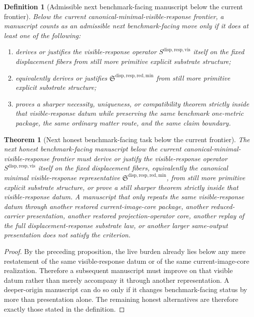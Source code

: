 \documentclass[11pt]{article}
\newcommand{\VisibleResponseOperator}{S^{\mathrm{disp,resp,vis}}}
\newcommand{\MinimalReducedStructure}{\mathfrak S^{\mathrm{disp,resp,red,min}}}
\newtheorem{definition}{Definition}
\newtheorem{theorem}{Theorem}
\begin{document}
\begin{definition}[Admissible next benchmark-facing manuscript below the current frontier]
Below the current canonical-minimal-visible-response frontier, a manuscript counts as an admissible next benchmark-facing move only if it does at least one of the following:
\begin{enumerate}
    \item derives or justifies the visible-response operator \(\VisibleResponseOperator\) itself on the fixed displacement fibers from still more primitive explicit substrate structure;
    \item equivalently derives or justifies \(\MinimalReducedStructure\) from still more primitive explicit substrate structure;
    \item proves a sharper necessity, uniqueness, or compatibility theorem strictly inside that visible-response datum while preserving the same benchmark one-metric package, the same ordinary matter route, and the same claim boundary.
\end{enumerate}
\end{definition}

\begin{theorem}[Next honest benchmark-facing task below the current frontier]
The next honest benchmark-facing manuscript below the current canonical-minimal-visible-response frontier must derive or justify the visible-response operator \(\VisibleResponseOperator\) itself on the fixed displacement fibers, equivalently the canonical minimal visible-response representative \(\MinimalReducedStructure\), from still more primitive explicit substrate structure, or prove a still sharper theorem strictly inside that visible-response datum. A manuscript that only repeats the same visible-response datum through another restored current-image-core package, another reduced-carrier presentation, another restored projection-operator core, another replay of the full displacement-response substrate law, or another larger same-output presentation does not satisfy the criterion.
\end{theorem}

\begin{proof}
By the preceding proposition, the live burden already lies below any mere restatement of the same visible-response datum or of the same current-image-core realization. Therefore a subsequent manuscript must improve on that visible datum rather than merely accompany it through another representation. A deeper-origin manuscript can do so only if it changes benchmark-facing status by more than presentation alone. The remaining honest alternatives are therefore exactly those stated in the definition.
\end{proof}
\end{document}

